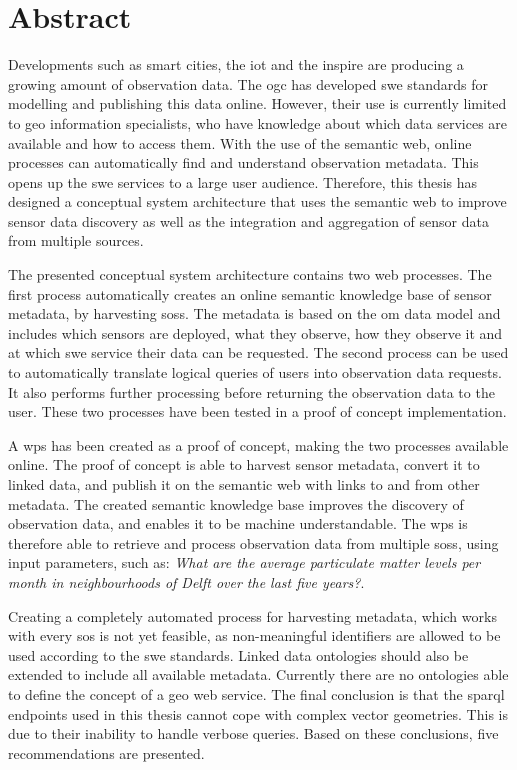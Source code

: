 
\chapter*{Abstract}


Developments such as smart cities, the \acf*{iot} and the \ac*{inspire} are producing a growing amount of observation data. The \ac*{ogc} has developed \ac*{swe} standards for modelling and publishing this data online. However, their use is currently limited to geo information specialists, who have knowledge about which data services are available and how to access them. With the use of the semantic web, online processes can automatically find and understand observation metadata. This opens up the \acs*{swe} services to a large user audience. Therefore, this thesis has designed a conceptual system architecture that uses the semantic web to improve sensor data discovery as well as the integration and aggregation of sensor data from multiple sources.

The presented conceptual system architecture contains two web processes. The first process automatically creates an online semantic knowledge base of sensor metadata, by harvesting \aclp*{sos}. The metadata is based on the \acf*{om} data model and includes which sensors are deployed, what they observe, how they observe it and at which \acs*{swe} service their data can be requested. The second process can be used to automatically translate logical queries of users into observation data requests. It also performs further processing before returning the observation data to the user. These two processes have been tested in a proof of concept implementation.

A \ac*{wps} has been created as a proof of concept, making the two processes available online. The proof of concept is able to harvest sensor metadata, convert it to linked data, and publish it on the semantic web with links to and from other metadata. The created semantic knowledge base improves the discovery of observation data, and enables it to be machine understandable. The \acs*{wps} is therefore able to retrieve and process observation data from multiple \aclp*{sos}, using input parameters, such as: \textit{What are the average particulate matter levels per month in neighbourhoods of Delft over the last five years?}.  
 
Creating a completely automated process for harvesting metadata, which works with every \acl*{sos} is not yet feasible, as non-meaningful identifiers are allowed to be used according to the \acs*{swe} standards. Linked data ontologies should also be extended to include all available metadata. Currently there are no ontologies able to define the concept of a geo web service. The final conclusion is that the \acs*{sparql} endpoints used in this thesis cannot cope with complex vector geometries. This is due to their inability to handle verbose queries. Based on these conclusions, five recommendations are presented.